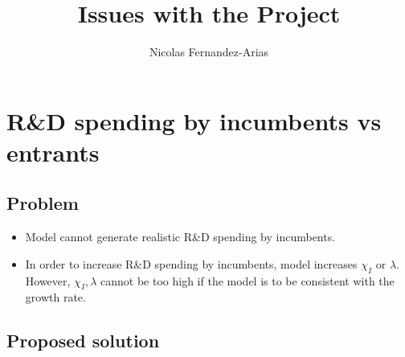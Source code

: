 \documentclass[11pt,english]{article}
\theoremstyle{remark}
\begin{document}
	
\title{Issues with the Project}
\author{Nicolas Fernandez-Arias}
\maketitle

\section*{R\&D spending by incumbents vs entrants}

\subsection*{Problem}

\begin{itemize}
	\item Model cannot generate realistic R\&D spending by incumbents.
	\item In order to increase R\&D spending by incumbents, model increases $\chi_I$ or $\lambda$. However, $\chi_I,\lambda$ cannot be too high if the model is to be consistent with the growth rate. 
\end{itemize}

\subsection*{Proposed solution}
\end{document}
